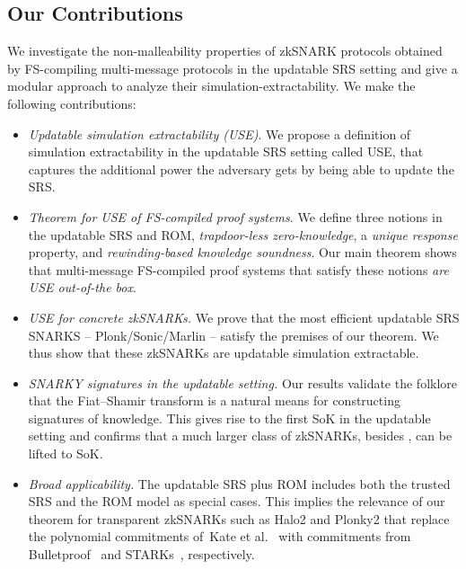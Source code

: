 \documentclass[10pt]{llncs}
\begin{document}
\subsection{Our Contributions}
We investigate the non-malleability properties of zkSNARK protocols obtained by FS-compiling multi-message protocols in the updatable SRS setting and give a modular approach to analyze their simulation-extractability. We make the following contributions:
\begin{itemize}
	\item 
	\emph{Updatable simulation extractability (USE)}. 
	We propose a definition of simulation extractability in the updatable SRS setting called USE, that captures the additional power the adversary gets by being able to update the SRS. 
	
	\item \emph{Theorem for USE of FS-compiled proof systems.} We
	define three notions in the updatable SRS and ROM, 
	\emph{trapdoor-less zero-knowledge},
	a \emph{unique response} property, and \emph{rewinding-based
		knowledge soundness}. Our main theorem shows that multi-message FS-compiled proof systems that satisfy these notions \emph{are USE
		out-of-the box}. %
	
	\item
	\emph{USE for concrete zkSNARKs.}
	We prove that the most efficient updatable SRS SNARKS -- Plonk/Sonic/Marlin -- satisfy the premises of our theorem. We thus show that these zkSNARKs are updatable simulation extractable.
	
	\item
	\emph{SNARKY signatures in the updatable setting.} Our results validate the folklore that the Fiat--Shamir transform is a natural means for constructing signatures of knowledge. This gives rise to the first SoK in the updatable setting and confirms that a much larger class of zkSNARKs, besides \cite{C:GroMal17}, can be lifted to SoK.
	
	\item \emph{Broad applicability.} The updatable SRS plus ROM includes both the trusted SRS and the ROM model as special cases. This implies the relevance of our theorem for transparent zkSNARKs such as Halo2 and Plonky2 that replace the polynomial commitments of~Kate et al.~\cite{AC:KatZavGol10} with commitments from Bulletproof~\cite{SP:BBBPWM18} and STARKs~\cite{EPRINT:BBHR18}, respectively.
	
\end{itemize}
\end{document}
